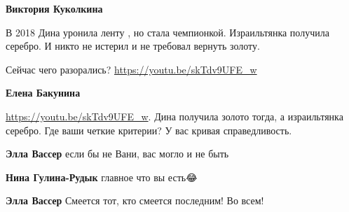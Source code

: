 \begin{itemize}
\begin{itemize}
 
\textbf{Виктория Куколкина} 

В 2018 Дина уронила ленту , но стала чемпионкой. Израильтянка получила серебро.
И никто не истерил и не требовал вернуть золоту. 

Сейчас чего разорались? \url{https://youtu.be/skTdv9UFE_w}

 
\textbf{Елена Бакунина} 

\url{https://youtu.be/skTdv9UFE_w}. Дина получила золото тогда, а израильтянка
серебро. Где ваши четкие критерии? У вас кривая справедливость.

 
\textbf{Элла Вассер} если бы не Вани, вас могло и не быть

 
\textbf{Нина Гулина-Рудык} главное что вы есть😂

 
\textbf{Элла Вассер} Смеется тот, кто смеется последним! Во всем!

 

\end{itemize}
\end{itemize}
